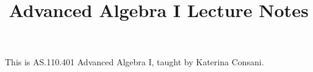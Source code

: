 \documentclass{article}
\begin{document}
\title{Advanced Algebra I Lecture Notes}
\maketitle
	This is AS.110.401 Advanced Algebra I, taught by Katerina Consani.

\thispagestyle{fancy}

\tableofcontents

\newpage
\end{document}
